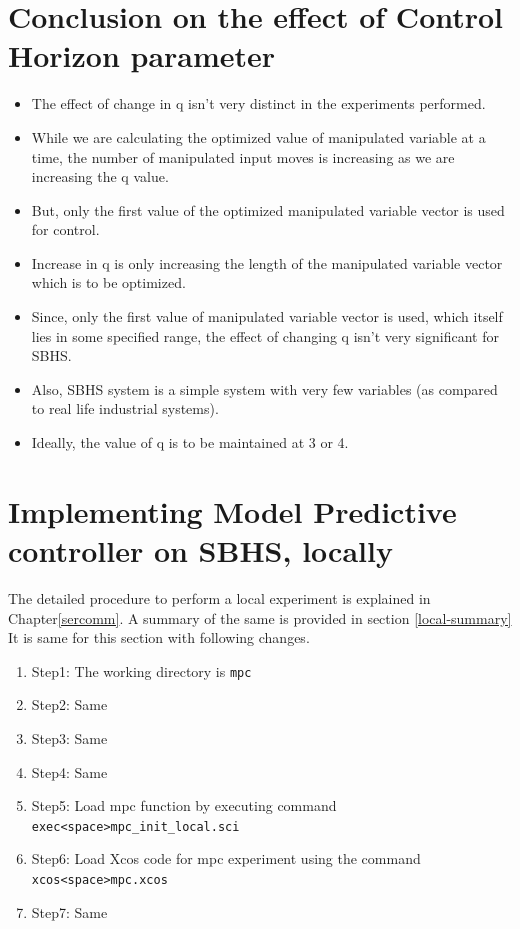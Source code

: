 \section{Conclusion on the effect of Control Horizon parameter }
\begin{itemize}
\item The effect of change in q isn’t very distinct in the experiments performed.
\item While we are calculating the optimized value of manipulated variable at a time, the number of manipulated input moves is increasing as we are increasing the q value. 
\item But, only the first value of the optimized manipulated variable vector is used for control. 
\item Increase in q is only increasing the length of the manipulated variable vector which is to be optimized.
\item Since, only the first value of manipulated variable vector is used, which itself lies in some specified range, the effect of changing q isn’t very significant for SBHS.
\item Also, SBHS system is a simple system with very few variables (as compared to real life industrial systems).
\item Ideally, the value of q is to be maintained at 3 or 4.
\end{itemize}

\section{Implementing Model Predictive controller on SBHS, locally}

The detailed procedure to perform a local experiment is explained in Chapter\ref{sercomm}. A summary of the same is provided in section \ref{local-summary} It is same for this section with following changes.

\begin{enumerate}
\item Step1: The working directory is {\tt  mpc}
\item Step2: Same
\item Step3: Same
\item Step4: Same
\item Step5: Load mpc function by executing command\\ {\tt exec<space>mpc\_init\_local.sci}
\item Step6: Load Xcos code for mpc experiment using the command\\ {\tt xcos<space>mpc.xcos}
\item Step7: Same
\end{enumerate}


